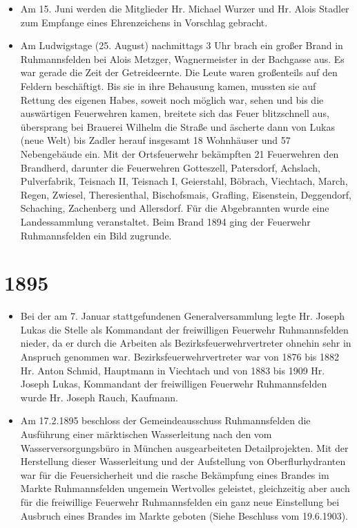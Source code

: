 \documentclass[12pt,a4paper]{book}
\begin{document}
\begin{itemize}
\item Am 15. Juni werden die Mitglieder Hr. Michael Wurzer und Hr. Alois
Stadler zum Empfange eines Ehrenzeichens in Vorschlag gebracht.

\item Am Ludwigstage (25. August) nachmittags 3 Uhr brach ein großer
Brand in Ruhmannsfelden bei Alois Metzger, Wagnermeister in der
Bachgasse aus. Es war gerade die Zeit der Getreideernte. Die Leute waren
großenteils auf den Feldern beschäftigt. Bis sie in ihre Behausung
kamen, mussten sie auf Rettung des eigenen Habes, soweit noch möglich
war, sehen und bis die auswärtigen Feuerwehren kamen, breitete sich das
Feuer blitzschnell aus, übersprang bei Brauerei Wilhelm die Straße und
äscherte dann von Lukas (neue Welt) bis Zadler herauf insgesamt 18
Wohnhäuser und 57 Nebengebäude ein. Mit der Ortsfeuerwehr bekämpften 21
Feuerwehren den Brandherd, darunter die Feuerwehren Gotteszell,
Patersdorf, Achslach, Pulverfabrik, Teisnach II, Teisnach I, Geierstahl,
Böbrach, Viechtach, March, Regen, Zwiesel, Theresienthal, Bischofsmais,
Grafling, Eisenstein, Deggendorf, Schaching, Zachenberg und Allersdorf.
Für die Abgebrannten wurde eine Landessammlung veranstaltet. Beim Brand
1894 ging der Feuerwehr Ruhmannsfelden ein Bild zugrunde.
\end{itemize}

\section*{1895}

\begin{itemize}
\item Bei der am 7. Januar stattgefundenen Generalversammlung legte Hr.
Joseph Lukas die Stelle als Kommandant der freiwilligen Feuerwehr
Ruhmannsfelden nieder, da er durch die Arbeiten als
Bezirksfeuerwehrvertreter ohnehin sehr in Anspruch genommen war.
Bezirksfeuerwehrvertreter war von 1876 bis 1882 Hr. Anton Schmid,
Hauptmann in Viechtach und von 1883 bis 1909 Hr. Joseph Lukas,
Kommandant der freiwilligen Feuerwehr Ruhmannsfelden wurde Hr. Joseph
Rauch, Kaufmann.

\item Am 17.2.1895 beschloss der Gemeindeausschuss Ruhmannsfelden die
Ausführung einer märktischen Wasserleitung nach den vom
Wasserversorgungsbüro in München ausgearbeiteten Detailprojekten. Mit
der Herstellung dieser Wasserleitung und der Aufstellung von
Oberflurhydranten war für die Feuersicherheit und die rasche Bekämpfung
eines Brandes im Markte Ruhmannsfelden ungemein Wertvolles geleistet,
gleichzeitig aber auch für die freiwillige Feuerwehr Ruhmannsfelden ein
ganz neue Einstellung bei Ausbruch eines Brandes im Markte geboten
(Siehe Beschluss vom 19.6.1903).
\end{itemize}
\end{document}
